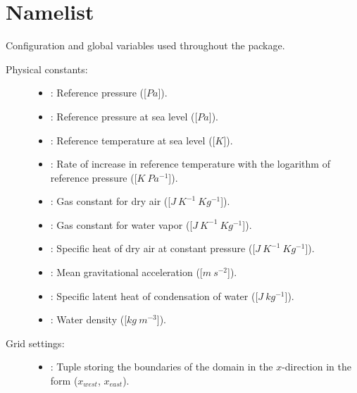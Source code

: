 \documentclass[letterpaper,10pt,english]{sphinxmanual}
\begin{document}
\section{Namelist}
\label{\detokenize{api:module-namelist}}\label{\detokenize{api:namelist}}
Configuration and global variables used throughout the package.
\begin{description}
\item[{Physical constants:}] \leavevmode\begin{itemize}
\item {} 
: Reference pressure ({[}\(Pa\){]}).

\item {} 
: Reference pressure at sea level ({[}\(Pa\){]}).

\item {} 
: Reference temperature at sea level ({[}\(K\){]}).

\item {} 
: Rate of increase in reference temperature with the logarithm           of reference pressure ({[}\(K ~ Pa^{-1}\){]}).

\item {} 
: Gas constant for dry air ({[}\(J ~ K^{-1} ~ Kg^{-1}\){]}).

\item {} 
: Gas constant for water vapor ({[}\(J ~ K^{-1} ~ Kg^{-1}\){]}).

\item {} 
: Specific heat of dry air at constant pressure ({[}\(J ~ K^{-1} ~ Kg^{-1}\){]}).

\item {} 
: Mean gravitational acceleration ({[}\(m ~ s^{-2}\){]}).

\item {} 
: Specific latent heat of condensation of water ({[}\(J ~ kg^{-1}\){]}).

\item {} 
: Water density ({[}\(kg ~ m^{-3}\){]}).

\end{itemize}

\item[{Grid settings:}] \leavevmode\begin{itemize}
\item {} 
: Tuple storing the boundaries of the domain in the          \(x\)-direction in the form (\(x_{west}\), \(x_{east}\)).


\end{itemize}
\end{description}
\end{document}
